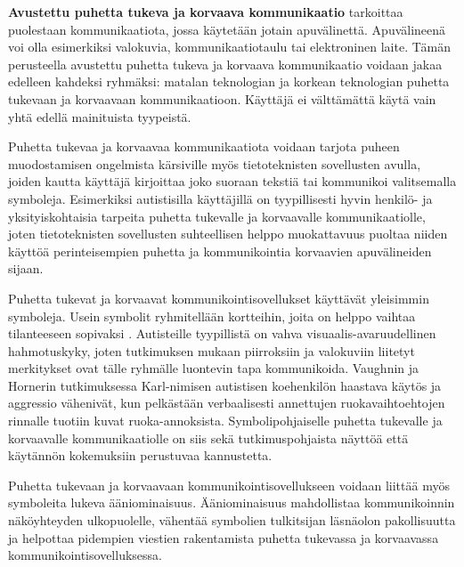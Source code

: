 \documentclass[utf8]{gradu3}
\begin{document}
\textbf{Avustettu puhetta tukeva ja korvaava kommunikaatio} tarkoittaa puolestaan kommunikaatiota, jossa käytetään jotain apuvälinettä. Apuvälineenä voi olla esimerkiksi valokuvia, kommunikaatiotaulu tai elektroninen laite. Tämän perusteella avustettu puhetta tukeva ja korvaava kommunikaatio voidaan jakaa edelleen kahdeksi ryhmäksi: matalan teknologian ja korkean teknologian puhetta tukevaan ja korvaavaan kommunikaatioon. Käyttäjä ei välttämättä käytä vain yhtä edellä mainituista tyypeistä. \parencite[]{AAC-conditional-use}

Puhetta tukevaa ja korvaavaa kommunikaatiota voidaan tarjota puheen muodostamisen ongelmista kärsiville myös tietoteknisten sovellusten avulla, joiden kautta käyttäjä kirjoittaa joko suoraan tekstiä tai kommunikoi valitsemalla symboleja. Esimerkiksi autistisilla käyttäjillä on tyypillisesti hyvin henkilö- ja yksityiskohtaisia tarpeita puhetta tukevalle ja korvaavalle kommunikaatiolle, joten tietoteknisten sovellusten suhteellisen helppo muokattavuus puoltaa niiden käyttöä perinteisempien puhetta ja kommunikointia korvaavien apuvälineiden sijaan.

\label{AAC-symbols}
Puhetta tukevat ja korvaavat kommunikointisovellukset käyttävät yleisimmin symboleja. Usein symbolit ryhmitellään kortteihin, joita on helppo vaihtaa tilanteeseen sopivaksi \label{AAC-cards}. Autisteille tyypillistä on vahva visuaalis-avaruudellinen hahmotuskyky, joten tutkimuksen mukaan piirroksiin ja valokuviin liitetyt merkitykset ovat tälle ryhmälle luontevin tapa kommunikoida. Vaughnin ja Hornerin tutkimuksessa \parencite[]{concrete-versus-verbal} Karl-nimisen autistisen koehenkilön haastava käytös ja aggressio vähenivät, kun pelkästään verbaalisesti annettujen ruokavaihtoehtojen rinnalle tuotiin kuvat ruoka-annoksista. Symbolipohjaiselle puhetta tukevalle ja korvaavalle kommunikaatiolle on siis sekä tutkimuspohjaista näyttöä että käytännön kokemuksiin perustuvaa kannustetta.

Puhetta tukevaan ja korvaavaan kommunikointisovellukseen voidaan liittää myös symboleita lukeva ääniominaisuus. Ääniominaisuus mahdollistaa kommunikoinnin näköyhteyden ulkopuolelle, vähentää symbolien tulkitsijan läsnäolon pakollisuutta ja helpottaa pidempien viestien rakentamista puhetta tukevassa ja korvaavassa kommunikointisovelluksessa. \parencite[]{AAC-interventions}
\end{document}

